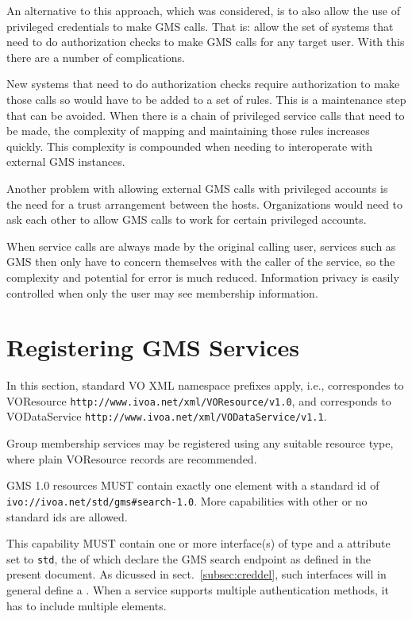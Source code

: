 \documentclass[11pt,a4paper]{ivoa}
\begin{document}
An alternative to this approach, which was considered, is to also allow the use of privileged credentials to make GMS calls.  That is: allow the set of systems that need to do authorization checks to make GMS calls for any target user.  With this there are a number of complications.

New systems that need to do authorization checks require authorization to make those calls so would have to be added to a set of rules.  This is a maintenance step that can be avoided.  When there is a chain of privileged service calls that need to be made, the complexity of mapping and maintaining those rules increases quickly.  This complexity is compounded when needing to interoperate with external GMS instances.

Another problem with allowing external GMS calls with privileged accounts is the need for a trust arrangement between the hosts.  Organizations would need to ask each other to allow GMS calls to work for certain privileged accounts.

When service calls are always made by the original calling user, services such as GMS then only have to concern themselves with the caller of the service, so the complexity and potential for error is much reduced.  Information privacy is easily controlled when only the user may see membership information.


\section{Registering GMS Services}

In this section, standard VO XML namespace prefixes apply, i.e.,
 correspondes to VOResource \citep{2018ivoa.spec.0625P}
\nolinkurl{http://www.ivoa.net/xml/VOResource/v1.0}, and
 corresponds to VODataService \citep{2010ivoa.spec.1202P}
\nolinkurl{http://www.ivoa.net/xml/VODataService/v1.1}.

Group membership services may be registered using any suitable resource type, where plain VOResource  records are recommended.

GMS 1.0 resources MUST contain exactly one  element with a standard id of \nolinkurl{ivo://ivoa.net/std/gms#search-1.0}.  More capabilities with other or no standard ids are allowed.

This capability MUST contain one or more interface(s) of type  and a  attribute set to \verb|std|, the  of which declare the GMS search endpoint as defined in the present document.  As dicussed in sect.~\ref{subsec:creddel}, such interfaces will in general define a .  When a service supports multiple authentication methods, it has to include multiple  elements.
\end{document}

